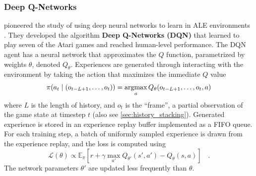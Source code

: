 \subsubsection{Deep Q-Networks} \label{sec:dqn}
\citeauthor{PlayingAtariDeep_Mnih.Kavukcuoglu.ea_2013} pioneered the study of using deep neural networks to learn in ALE environments \cite{PlayingAtariDeep_Mnih.Kavukcuoglu.ea_2013}.
They developed the algorithm \textbf{Deep Q-Networks (DQN)} that learned to play seven of the Atari games and reached human-level performance.
The DQN agent has a neural network that approximates the $Q$ function, parametrized by weights $\theta$, denoted $Q_\theta$.
Experiences are generated through interacting with the environment by taking the action that maximizes the immediate $Q$ value
\begin{align*}
    \pi(a_t \mid (o_{t - L + 1}, \dots, o_t)) = \operatorname*{argmax}_{a}{Q_{\theta}(o_{t - L + 1}, \dots, o_t, a)}
\end{align*}
where $L$ is the length of history, and $o_t$ is the ``frame'', a partial observation of the game state at timestep $t$ (also see \ref{sec:history_stacking}).
Generated experience is stored in an experience replay buffer implemented as a FIFO queue.
For each training step, a batch of uniformly sampled experience is drawn from the experience replay, and the loss is computed using
\begin{equation*}
    \mathcal{L}(\theta) \propto \mathbb{E}_\pi\left[r + \gamma \max _{a'} Q_{\theta'}(s', a') - Q_{\theta}(s, a) \right] ~~~~ .
\end{equation*}
The network parameters $\theta'$ are updated less frequently than $\theta$.

